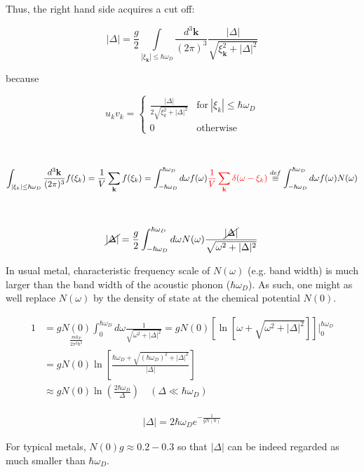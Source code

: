 Thus, the right hand side acquires a cut off:

\[|\Delta|=\frac{g}{2}\underset{|\xi_{\bm{k}}|\le\hbar\omega_D}{\int}\frac{d^3 \bm{k}}{(2\pi)^3}\frac{|\Delta|}{\sqrt{\xi_{\bm{k}}^2+|\Delta|^2}} \]

because

\[u_k v_k = \begin{cases}
\frac{|\Delta|}{2\sqrt{\xi_k^2+|\Delta|^2}} & \text{for}\ |\xi_k|\le\hbar\omega_D\\
0 & \text{otherwise}
\end{cases} \]

\dotfill

\ 

\[\int_{|\xi_k|\le\hbar\omega_D}\frac{d^3{\bf k}}{(2\pi)^3}f(\xi_k) = \frac{1}{V}\sum_{\bf k}f(\xi_k) = \int_{-\hbar\omega_D}^{\hbar\omega_D}d\omega f(\omega) {\color{red}{\frac{1}{V}\sum_{\bf k}\delta(\omega-\xi_k)}} \overset{def}{\equiv}\int_{-\hbar\omega_D}^{\hbar\omega_D}d\omega f(\omega)N(\omega) \]

\dotfill

\ 

\[\cancel{|\Delta|} = \frac{g}{2}\int_{-\hbar\omega_D}^{\hbar\omega_D}d\omega N(\omega)\frac{\cancel{|\Delta|}}{\sqrt{\omega^2+|\Delta|^2}} \]

In usual metal, characteristic frequency scale of $N(\omega)$ (e.g. band width) is much larger than the band width of the acoustic phonon ($\hbar\omega_D$). As such, one might as well replace $N(\omega)$ by the density of state at the chemical potential $N(0)$.

\[\begin{split}
1 &= g\underset{\frac{mk_F}{2\pi^2\hbar^2}}{N(0)}\int_0^{\hbar\omega_D} d\omega\frac{1}{\sqrt{\omega^2+|\Delta|^2}} = gN(0)\left[\ln[\omega+\sqrt{\omega^2+|\Delta|^2}]\right]\Big|_0^{\hbar\omega_D}\\
&=gN(0)\ln\left[\frac{\hbar\omega_D+\sqrt{(\hbar\omega_D)^2+|\Delta|^2}}{|\Delta|}\right]\\
&\approx gN(0)\ln\left(\frac{2\hbar\omega_D}{\Delta}\right)\quad (\Delta\ll\hbar\omega_D)
\end{split} \]

\begin{align}\tag{B}\label{eq6B}
|\Delta| = 2\hbar\omega_De^{-\frac{1}{gN(0)}}
\end{align}

For typical metals, $N(0)g\approx0.2-0.3$ so that $|\Delta|$ can be indeed regarded as much smaller than $\hbar\omega_D$. 

